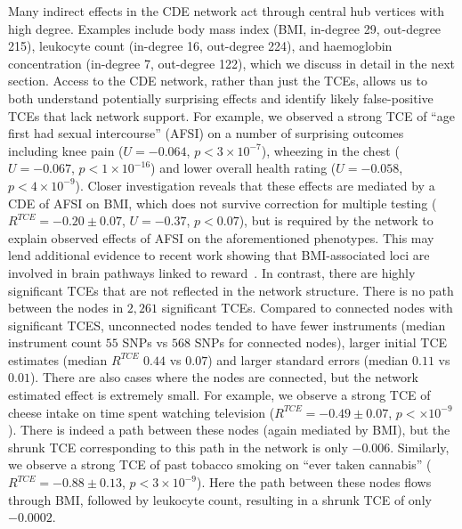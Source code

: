 \documentclass{article}
\begin{document}
Many indirect effects in the CDE network act through central hub vertices
with high degree. Examples include body mass index (BMI, in-degree 29, out-degree 215),
leukocyte count (in-degree 16, out-degree 224), and
haemoglobin concentration (in-degree 7, out-degree 122), which we discuss in detail in the next
section. Access to the CDE network, rather than just the TCEs, allows us to both understand potentially
surprising effects and identify likely false-positive TCEs that lack network support.
For example, we observed a strong TCE of ``age first had sexual intercourse'' (AFSI) on a number
of surprising outcomes including knee pain ($U = -0.064$, $p < 3 \times 10^{-7}$),
wheezing in the chest ($U = -0.067$, $p < 1 \times 10^{-16}$) and
lower overall health rating ($U = -0.058$, $p < 4 \times 10^{-9}$). Closer investigation reveals
that these effects are mediated by a CDE of AFSI on BMI, which does not survive
correction for multiple testing ($R^{TCE} = -0.20 \pm 0.07$, $U = -0.37$, $p < 0.07$),
but is required by the network to explain observed effects of AFSI on the aforementioned phenotypes.
This may lend additional evidence to recent work showing that BMI-associated loci are involved
in brain pathways linked to reward~\cite{Ndiaye2020}.
In contrast, there are highly significant TCEs that are not reflected in
the network structure. There is no path between the nodes in $2,261$ significant TCEs.
Compared to connected nodes with significant TCES, unconnected nodes tended to have fewer instruments
(median instrument count $55$ SNPs vs $568$ SNPs for connected nodes), larger initial
TCE estimates (median $R^{TCE}$ $0.44$ vs $0.07$) and larger standard errors
(median $0.11$ vs $0.01$). There are also cases where the nodes are connected, but the network
estimated effect is extremely small.
For example, we observe a strong TCE of cheese intake on time spent watching television
($R^{TCE} = -0.49 \pm 0.07$, $p <  \times 10^{-9}$).
There is indeed a path between these nodes (again mediated by BMI), but the shrunk TCE corresponding
to this path in the network is only $-0.006$. Similarly, we observe a strong TCE of 
past tobacco smoking on ``ever taken cannabis'' ($R^{TCE} = -0.88 \pm 0.13$, $p < 3 \times 10^{-9}$).
Here the path between these nodes flows through BMI, followed by leukocyte count,
resulting in a shrunk TCE of only $-0.0002$.
 
\end{document}
